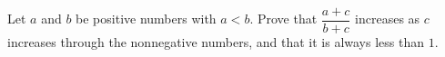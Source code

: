 Let $a$ and $b$ be positive numbers with $a<b$. Prove that $\dfrac{a+c}{b+c}$ increases as $c$ increases through the nonnegative numbers, and that it is always less than $1$.
